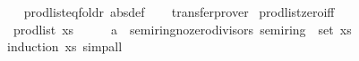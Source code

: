 \begin{isabellebody}
%
\isadelimproof
\ \ %
\endisadelimproof
%
\isatagproof
{}\isamarkupfalse%
\ prod{\isacharunderscore}{\kern0pt}list{\isachardot}{\kern0pt}eq{\isacharunderscore}{\kern0pt}foldr\ {\isacharbrackleft}{\kern0pt}abs{\isacharunderscore}{\kern0pt}def{\isacharbrackright}{\kern0pt}\isanewline
\ \ \isamarkupfalse%
\ transfer{\isacharunderscore}{\kern0pt}prover%
\endisatagproof
{\isafoldproof}%
%
\isadelimproof
\isanewline
%
\endisadelimproof
\isanewline
{}\isamarkupfalse%
\isanewline
\isanewline
{}\isamarkupfalse%
\ prod{\isacharunderscore}{\kern0pt}list{\isacharunderscore}{\kern0pt}zero{\isacharunderscore}{\kern0pt}iff{\isacharcolon}{\kern0pt}\isanewline
\ \ {\isachardoublequoteopen}prod{\isacharunderscore}{\kern0pt}list\ xs\ {\isacharequal}{\kern0pt}\ {}\ {\isasymlongleftrightarrow}\ {\isacharparenleft}{\kern0pt}{}\ {\isacharcolon}{\kern0pt}{\isacharcolon}{\kern0pt}\ {\isacharprime}{\kern0pt}a\ {\isacharcolon}{\kern0pt}{\isacharcolon}{\kern0pt}\ {\isacharbraceleft}{\kern0pt}semiring{\isacharunderscore}{\kern0pt}no{\isacharunderscore}{\kern0pt}zero{\isacharunderscore}{\kern0pt}divisors{\isacharcomma}{\kern0pt}\ semiring{\isacharunderscore}{\kern0pt}{}{\isacharbraceright}{\kern0pt}{\isacharparenright}{\kern0pt}\ {\isasymin}\ set\ xs{\isachardoublequoteclose}\isanewline
%
\isadelimproof
\ \ %
\endisadelimproof
%
\isatagproof
{}\isamarkupfalse%
\ {\isacharparenleft}{\kern0pt}induction\ xs{\isacharparenright}{\kern0pt}\ simp{\isacharunderscore}{\kern0pt}all%
\endisatagproof
{\isafoldproof}%
%
\isadelimproof
\isanewline
%
\endisadelimproof
%
\isadelimtheory
\isanewline
%
\endisadelimtheory
%
\isatagtheory
{}\isamarkupfalse%
%
\endisatagtheory
{\isafoldtheory}%
%
\isadelimtheory
%
\endisadelimtheory
%
\end{isabellebody}%
\endinput
